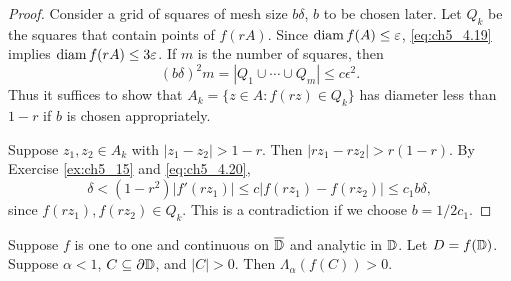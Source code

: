 \begin{proof}
Consider a grid of squares of mesh size $b\delta$, $b$ to be chosen later. Let $Q_k$ be the squares that contain points of $f(rA)$. Since $\operatorname{diam} f(A) \leq \varepsilon$, \eqref{eq:ch5_4.19} implies $\operatorname{diam} f(rA) \leq 3\varepsilon$. If $m$ is the number of squares, then
\[
    (b\delta)^2m = |Q_1 \cup \cdots \cup Q_m| \leq c\epsilon^2.
\]
Thus it suffices to show that $A_k = \{z \in A : f(rz) \in Q_k\}$ has diameter less than $1-r$ if $b$ is chosen appropriately.

Suppose $z_1,z_2 \in A_k$ with $|z_1 - z_2| > 1-r$. Then $|rz_1 - rz_2| > r(1-r)$. By Exercise \ref{ex:ch5_15} and \eqref{eq:ch5_4.20},
\begin{equation}\label{eq:ch5_4.21}
    \delta < (1-r^2)|f'(rz_1)| \leq c|f(rz_1) - f(rz_2)| \leq c_1b\delta,
\end{equation}
since $f(rz_1),f(rz_2) \in Q_k$. This is a contradiction if we choose $b = 1/2c_1$.
\end{proof}


\begin{theorem}\label{thm:ch5_4.9}
Suppose $f$ is one to one and continuous on $\overline{\mathbb{D}}$ and analytic in $\mathbb{D}$. Let $D = f(\mathbb{D})$. Suppose $\alpha < 1$, $C \subseteq \partial\mathbb{D}$, and $|C| > 0$. Then $\Lambda_\alpha(f(C)) > 0$.
\end{theorem}

